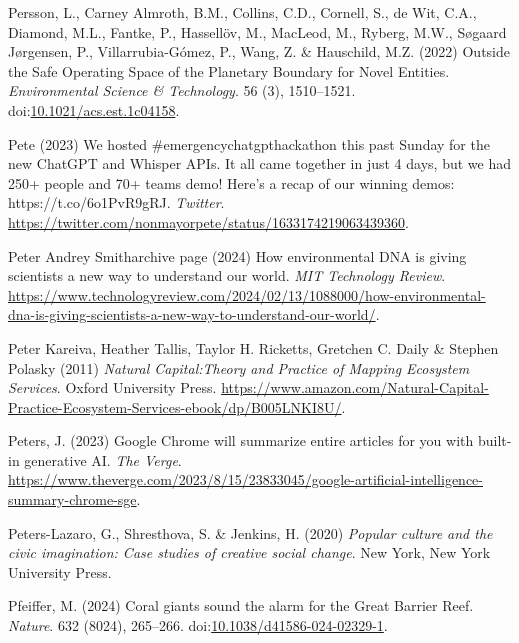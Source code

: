 \documentclass[
  letterpaper,
  DIV=11,
  numbers=noendperiod]{scrartcl}
\newlength{\cslhangindent}
\newenvironment{CSLReferences}[2] %
 {\begin{list}{}{%
  \setlength{\itemindent}{0pt}
  \setlength{\leftmargin}{0pt}
  \setlength{\parsep}{0pt}
  \ifodd #1
   \setlength{\leftmargin}{\cslhangindent}
   \setlength{\itemindent}{-1\cslhangindent}
  \fi
  \setlength{\itemsep}{#2\baselineskip}}}
 {\end{list}}
\begin{document}
\begin{CSLReferences}{0}{1}
Persson, L., Carney Almroth, B.M., Collins, C.D., Cornell, S., de Wit,
C.A., Diamond, M.L., Fantke, P., Hassellöv, M., MacLeod, M., Ryberg,
M.W., Søgaard Jørgensen, P., Villarrubia-Gómez, P., Wang, Z. \&
Hauschild, M.Z. (2022) Outside the {Safe Operating Space} of the
{Planetary Boundary} for {Novel Entities}. \emph{Environmental Science
\& Technology}. 56 (3), 1510--1521.
doi:\href{https://doi.org/10.1021/acs.est.1c04158}{10.1021/acs.est.1c04158}.

Pete (2023) We hosted \#emergencychatgpthackathon this past {Sunday} for
the new {ChatGPT} and {Whisper APIs}. {It} all came together in just 4
days, but we had 250+ people and 70+ teams demo! {Here}'s a recap of our
winning demos: {https://t.co/6o1PvR9gRJ}. \emph{Twitter}.
\url{https://twitter.com/nonmayorpete/status/1633174219063439360}.

Peter Andrey Smitharchive page (2024) How environmental {DNA} is giving
scientists a new way to understand our world. \emph{MIT Technology
Review}.
\url{https://www.technologyreview.com/2024/02/13/1088000/how-environmental-dna-is-giving-scientists-a-new-way-to-understand-our-world/}.

Peter Kareiva, Heather Tallis, Taylor H. Ricketts, Gretchen C. Daily \&
Stephen Polasky (2011) \emph{Natural {Capital}:{Theory} and {Practice}
of {Mapping Ecosystem Services}}. Oxford University Press.
\url{https://www.amazon.com/Natural-Capital-Practice-Ecosystem-Services-ebook/dp/B005LNKI8U/}.

Peters, J. (2023) Google {Chrome} will summarize entire articles for you
with built-in generative {AI}. \emph{The Verge}.
\url{https://www.theverge.com/2023/8/15/23833045/google-artificial-intelligence-summary-chrome-sge}.

Peters-Lazaro, G., Shresthova, S. \& Jenkins, H. (2020) \emph{Popular
culture and the civic imagination: Case studies of creative social
change}. New York, New York University Press.

Pfeiffer, M. (2024) Coral giants sound the alarm for the {Great Barrier
Reef}. \emph{Nature}. 632 (8024), 265--266.
doi:\href{https://doi.org/10.1038/d41586-024-02329-1}{10.1038/d41586-024-02329-1}.


\end{CSLReferences}
\end{document}
